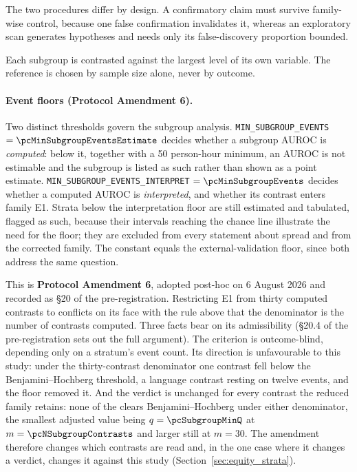 The two procedures differ by design. A confirmatory claim must survive
family-wise control, because one false confirmation invalidates it, whereas an
exploratory scan generates hypotheses and needs only its false-discovery
proportion bounded.

Each subgroup is contrasted against the largest level of its own variable. The
reference is chosen by sample size alone, never by outcome.

\paragraph{Event floors (Protocol Amendment 6).}
Two distinct thresholds govern the subgroup analysis.
\texttt{MIN\_SUBGROUP\_EVENTS} $= \pcMinSubgroupEventsEstimate$
decides whether a subgroup AUROC is \emph{computed}: below it, together with a
50 person-hour minimum, an AUROC is not estimable and the subgroup is listed as
such rather than shown as a point estimate.
\texttt{MIN\_SUBGROUP\_EVENTS\_INTERPRET} $= \pcMinSubgroupEvents$ decides
whether a computed AUROC is \emph{interpreted}, and whether its contrast enters
family E1. Strata below the interpretation floor are still estimated and
tabulated, flagged as such, because their intervals reaching the chance line
illustrate the need for the floor; they are excluded from every statement about
spread and from the corrected family. The constant equals the
external-validation floor, since both address the same question.

This is \textbf{Protocol Amendment 6}, adopted post-hoc on 6 August 2026 and
recorded as \S20 of the pre-registration. Restricting E1 from thirty computed
contrasts to \pcNSubgroupContrasts{} conflicts on its face with the rule above
that the denominator is the number of contrasts computed. Three facts bear on
its admissibility (\S20.4 of the pre-registration sets out the full argument).
The criterion is outcome-blind, depending only on a stratum's event count. Its
direction is unfavourable to this study: under the thirty-contrast denominator
one contrast fell below the Benjamini--Hochberg threshold, a language contrast
resting on twelve events, and the floor removed it. And the verdict is
unchanged for every contrast the reduced family retains: none of the
\pcNSubgroupContrasts{} clears Benjamini--Hochberg under either denominator, the
smallest adjusted value being $q = \pcSubgroupMinQ$ at
$m = \pcNSubgroupContrasts$ and larger still at $m = 30$. The amendment
therefore changes which contrasts are read and, in the one case where it
changes a verdict, changes it against this study
(Section~\ref{sec:equity_strata}).

